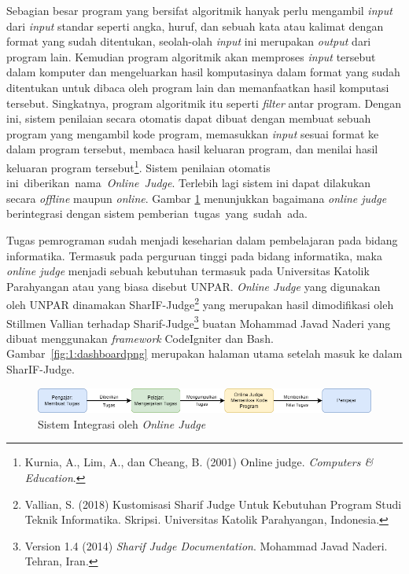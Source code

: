 \documentclass[a4paper,twoside]{article}
\begin{document}
Sebagian besar program yang bersifat algoritmik hanyak perlu mengambil \textit{input} dari \textit{input} standar seperti angka, huruf, dan sebuah kata atau kalimat dengan format yang sudah ditentukan, seolah-olah \textit{input} ini merupakan \textit{output} dari program lain. Kemudian program algoritmik akan memproses \textit{input} tersebut dalam komputer dan mengeluarkan hasil komputasinya dalam format yang sudah ditentukan untuk dibaca oleh program lain dan memanfaatkan hasil komputasi tersebut. Singkatnya, program algoritmik itu seperti \textit{filter} antar program. Dengan ini, sistem penilaian secara otomatis dapat dibuat dengan membuat sebuah program yang mengambil kode program, memasukkan \textit{input} sesuai format ke dalam program tersebut, membaca hasil keluaran program, dan menilai hasil keluaran program tersebut\footnote{Kurnia, A., Lim, A., dan Cheang, B. (2001) Online judge. {\em Computers \& Education}.}. Sistem penilaian otomatis \mbox{ini diberikan nama \textit{Online Judge}}. Terlebih lagi sistem ini dapat dilakukan secara \textit{offline} maupun \textit{online}. Gambar \ref{fig:1:onlinejudge} menunjukkan bagaimana \textit{online judge} berintegrasi dengan sistem \mbox{pemberian tugas yang sudah ada.}

Tugas pemrograman sudah menjadi keseharian dalam pembelajaran pada bidang informatika.
Termasuk pada perguruan tinggi pada bidang informatika, maka \textit{online judge} menjadi sebuah kebutuhan termasuk pada Universitas Katolik Parahyangan atau yang biasa disebut UNPAR.
\textit{Online Judge} yang digunakan oleh UNPAR dinamakan SharIF-Judge\footnote{Vallian, S. (2018) {Kustomisasi Sharif Judge Untuk Kebutuhan Program Studi Teknik Informatika}. Skripsi. Universitas Katolik Parahyangan, Indonesia.} yang merupakan hasil dimodifikasi oleh Stillmen Vallian terhadap Sharif-Judge\footnote{Version 1.4 (2014) {\em Sharif Judge Documentation}. Mohammad Javad Naderi. Tehran, Iran.} buatan Mohammad Javad Naderi yang dibuat menggunakan \textit{framework} CodeIgniter dan Bash. Gambar~\ref{fig:1:dashboardpng} merupakan halaman utama setelah masuk ke dalam SharIF-Judge.

\vspace{0.5cm}

\begin{figure}[H]
	\centering
	\includegraphics[width=\textwidth]{online_judge.drawio.png}
	\caption[Sistem Integrasi oleh \textit{Online Judge}]{Sistem Integrasi oleh \textit{Online Judge}}
	\label{fig:1:onlinejudge}
\end{figure}
\end{document}
